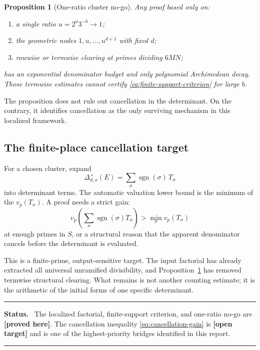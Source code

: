 \documentclass[11pt,oneside]{article}
\newtheorem{proposition}[theorem]{Proposition}
\theoremstyle{definition}
\theoremstyle{remark}
\newcommand{\sgn}{\operatorname{sgn}}
\newcommand{\statusproved}{\textcolor{newgreen}{\textbf{[proved here]}}}
\newcommand{\statusopen}{\textcolor{openorange}{\textbf{[open target]}}}
\newenvironment{statusbox}
{\begin{center}\begin{minipage}{0.94\textwidth}\raggedright\hrule
\vspace{0.42em}\textbf{Status.}\ }
{\par\vspace{0.32em}\hrule\end{minipage}\end{center}}
\begin{document}
\begin{proposition}[One-ratio cluster no-go]
\label{prop:cluster-nogo}
Any proof based only on:
\begin{enumerate}
\item a single ratio \(u=2^a3^{-b}\to1\);
\item the geometric nodes \(1,u,\ldots,u^{d+1}\) with fixed \(d\);
\item rowwise or termwise clearing at primes dividing \(6MN\);
\end{enumerate}
has an exponential denominator budget and only polynomial Archimedean decay.  Those
termwise estimates cannot certify \eqref{eq:finite-support-criterion} for large \(b\).
\end{proposition}

The proposition does not rule out cancellation in the determinant.  On the contrary, it
identifies cancellation as the only surviving mechanism in this localized framework.

\subsection{The finite-place cancellation target}

For a chosen cluster, expand
\[
 \Delta^\times_{d,x}(E)=\sum_{\sigma}\sgn(\sigma)\,T_\sigma
\]
into determinant terms.  The automatic valuation lower bound is the minimum of the
\(v_p(T_\sigma)\).  A proof needs a strict gain:
\begin{equation}
 v_p\!\left(\sum_\sigma\sgn(\sigma)T_\sigma\right)
 >
 \min_\sigma v_p(T_\sigma)
 \label{eq:cancellation-gain}
\end{equation}
at enough primes in \(S\), or a structural reason that the apparent denominator cancels before
the determinant is evaluated.

This is a finite-prime, output-sensitive target.  The input factorial has already extracted
all universal unramified divisibility, and Proposition~\ref{prop:cluster-nogo} has removed
termwise structural clearing.  What remains is not another counting estimate; it is the
arithmetic of the initial forms of one specific determinant.

\begin{statusbox}
The localized factorial, finite-support criterion, and one-ratio no-go are \statusproved.
The cancellation inequality \eqref{eq:cancellation-gain} is \statusopen{} and is one of the
highest-priority bridges identified in this report.
\end{statusbox}
\end{document}
